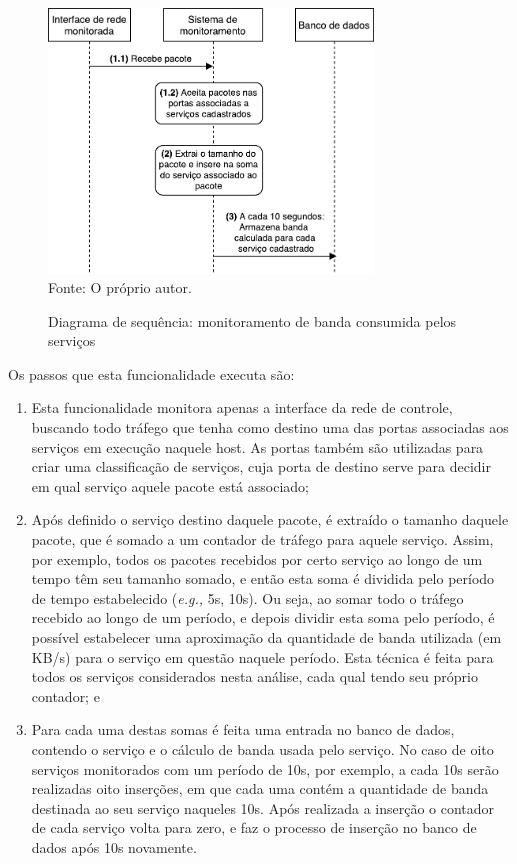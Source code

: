 \begin{figure}[!htb]
	\centering
	\caption{Diagrama de sequência: monitoramento de banda consumida pelos serviços}
    \vspace{-0.3cm}
	\includegraphics[width=0.77\textwidth]{img/sequencia_monitoramentoServicos.pdf}
	\label{fig:proposta_sequencia_servicos}\\
	Fonte: O próprio autor.
\end{figure}

Os passos que esta funcionalidade executa são:

\begin{enumerate}
\item Esta funcionalidade monitora apenas a interface da rede de controle, buscando todo tráfego que tenha como destino uma das portas associadas aos serviços em execução naquele host.
%
As portas também são utilizadas para criar uma classificação de serviços, cuja porta de destino serve para decidir em qual serviço aquele pacote está associado;

\item Após definido o serviço destino daquele pacote, é extraído o tamanho daquele pacote, que é somado a um contador de tráfego para aquele serviço.
%
Assim, por exemplo, todos os pacotes recebidos por certo serviço ao longo de um tempo têm seu tamanho somado, e então esta soma é dividida pelo período de tempo estabelecido (\textit{e.g.,} 5s, 10s).
%
Ou seja, ao somar todo o tráfego recebido ao longo de um período, e depois dividir esta soma pelo período, é possível estabelecer uma aproximação da quantidade de banda utilizada (em KB/s) para o serviço em questão naquele período.
%
Esta técnica é feita para todos os serviços considerados nesta análise, cada qual tendo seu próprio contador; e

\item Para cada uma destas somas é feita uma entrada no banco de dados, contendo o serviço e o cálculo de banda usada pelo serviço.
%
No caso de oito serviços monitorados com um período de 10s, por exemplo, a cada 10s serão realizadas oito inserções, em que cada uma contém a quantidade de banda destinada ao seu serviço naqueles 10s.
%
Após realizada a inserção o contador de cada serviço volta para zero, e faz o processo de inserção no banco de dados após 10s novamente.
\end{enumerate}


